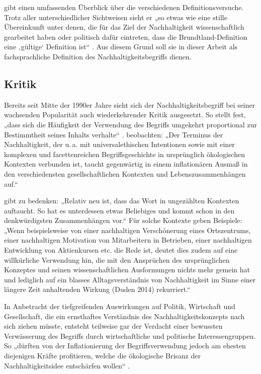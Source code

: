 \documentclass[
    german,
    a4paper,%
    12pt,%
    oneside,%
    toc=bibliography,
    final,
]{scrartcl}
\begin{document}
\citet[51ff.]{Ninck1997} gibt einen umfassenden Überblick über die verschiedenen Definitionsversuche. Trotz aller unterschiedlicher Sichtweisen sieht er „so etwas wie eine stille Übereinkunft unter denen, die für das Ziel der Nachhaltigkeit wissenschaftlich gearbeitet haben oder politisch dafür eintreten, dass die Brundtland-Definition eine ‚gültige‘ Definition ist“ \citep[54]{Ninck1997}. Aus diesem Grund soll sie in dieser Arbeit als fachsprachliche Definition des Nachhaltigkeitsbegriffs dienen.

\subsection{Kritik}
\label{subsec:kritik}

Bereits seit Mitte der 1990er Jahre sieht sich der Nachhaltigkeitsbegriff bei seiner wachsenden Popularität auch wiederkehrender Kritik ausgesetzt. So stellt \citet[178]{Görg1996} fest, „dass sich die Häufigkeit der Verwendung des Begriffs umgekehrt proportional zur Bestimmtheit seines Inhalts verhalte“ \citep[zitiert nach ][140]{Vogel2011}. \citet[5]{OhlmeierBrunold2015} beobachten: „Der Terminus der Nachhaltigkeit, der u.\,a. mit universalethischen Intentionen sowie mit einer komplexen und facettenreichen Begriffsgeschichte in ursprünglich ökologischen Kontexten verbunden ist, taucht gegenwärtig in einem inflationären Ausmaß in den verschiedensten gesellschaftlichen Kontexten und Lebenszusammenhängen auf.“

\citet[46]{Ninck1997} gibt zu bedenken: „Relativ neu ist, dass das Wort in ungezählten Kontexten auftaucht. So hat es unterdessen etwas Beliebiges und kommt schon in den denkwürdigsten Zusammenhängen vor.“ Für solche Kontexte geben \citet[5]{OhlmeierBrunold2015} Beispiele: „Wenn beispielsweise von einer nachhaltigen Verschönerung eines Ortszentrums, einer nachhaltigen Motivation von Mitarbeitern in Betrieben, einer nachhaltigen Entwicklung von Aktienkursen etc. die Rede ist, deutet dies zudem auf eine willkürliche Verwendung hin, die mit den Ansprüchen des ursprünglichen Konzeptes und seinen wissenschaftlichen Ausformungen nichts mehr gemein hat und lediglich auf ein blasses Alltagsverständnis von Nachhaltigkeit im Sinne einer längere Zeit anhaltenden Wirkung (Duden 2014) rekurriert.“

In Anbetracht der tiefgreifenden Auswirkungen auf Politik, Wirtschaft und Gesellschaft, die ein ernsthaftes Verständnis des Nachhaltigkeitskonzepts nach sich ziehen müsste, entsteht teilweise gar der Verdacht einer bewussten Verwässerung des Begriffs durch wirtschaftliche und politische Interessengruppen. So „dürften von der Inflationierung der Begriffsverwendung jedoch am ehesten diejenigen Kräfte profitieren, welche die ökologische Brisanz der Nachhaltigkeitsidee entschärfen wollen“ \citep[6]{OhlmeierBrunold2015}.
\end{document}
